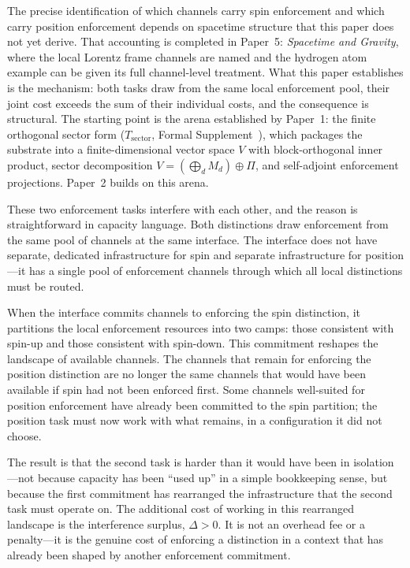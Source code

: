 \documentclass[11pt]{article}
\begin{document}
The precise identification of which channels carry spin enforcement and which carry position enforcement depends on spacetime structure that this paper does not yet derive.  That accounting is completed in Paper~5: \emph{Spacetime and Gravity}, where the local Lorentz frame channels are named and the hydrogen atom example can be given its full channel-level treatment.  What this paper establishes is the mechanism: both tasks draw from the same local enforcement pool, their joint cost exceeds the sum of their individual costs, and the consequence is structural.  The starting point is the arena established by Paper~1: the finite orthogonal sector form ($T_{\mathrm{sector}}$, Formal Supplement~\cite{BrookeSupplement}), which packages the substrate into a finite-dimensional vector space $V$ with block-orthogonal inner product, sector decomposition $V = (\bigoplus_d M_d) \oplus \Pi$, and self-adjoint enforcement projections.  Paper~2 builds on this arena.

These two enforcement tasks interfere with each other, and the reason is straightforward in capacity language.  Both distinctions draw enforcement from the same pool of channels at the same interface.  The interface does not have separate, dedicated infrastructure for spin and separate infrastructure for position---it has a single pool of enforcement channels through which all local distinctions must be routed.

When the interface commits channels to enforcing the spin distinction, it partitions the local enforcement resources into two camps: those consistent with spin-up and those consistent with spin-down.  This commitment reshapes the landscape of available channels.  The channels that remain for enforcing the position distinction are no longer the same channels that would have been available if spin had not been enforced first.  Some channels well-suited for position enforcement have already been committed to the spin partition; the position task must now work with what remains, in a configuration it did not choose.

The result is that the second task is harder than it would have been in isolation---not because capacity has been ``used up'' in a simple bookkeeping sense, but because the first commitment has rearranged the infrastructure that the second task must operate on.  The additional cost of working in this rearranged landscape is the interference surplus, $\Delta > 0$.  It is not an overhead fee or a penalty---it is the genuine cost of enforcing a distinction in a context that has already been shaped by another enforcement commitment.
\end{document}
